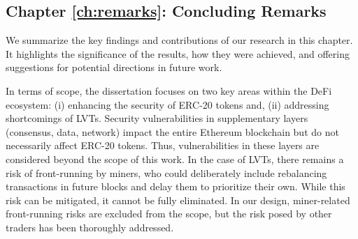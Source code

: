 \subsection*{Chapter \ref{ch:remarks}: Concluding Remarks}
We summarize the key findings and contributions of our research in this chapter. It highlights the significance of the results, how they were achieved, and offering suggestions for potential directions in future work.

In terms of scope, the dissertation focuses on two key areas within the DeFi ecosystem: (i) enhancing the security of ERC-20 tokens and, (ii) addressing shortcomings of LVTs. Security vulnerabilities in supplementary layers (\eg consensus, data, network) impact the entire Ethereum blockchain but do not necessarily affect ERC-20 tokens. Thus, vulnerabilities in these layers are considered beyond the scope of this work. In the case of LVTs, there remains a risk of front-running by miners, who could deliberately include rebalancing transactions in future blocks and delay them to prioritize their own. While this risk can be mitigated, it cannot be fully eliminated. In our design, miner-related front-running risks are excluded from the scope, but the risk posed by other traders has been thoroughly addressed.